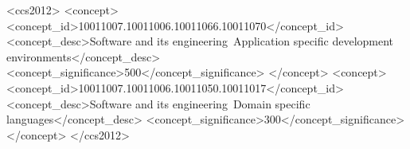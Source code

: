 \documentclass[sigplan,screen]{acmart}
\begin{document}
%
%


\begin{CCSXML}
<ccs2012>
<concept>
<concept_id>10011007.10011006.10011066.10011070</concept_id>
<concept_desc>Software and its engineering~Application specific development environments</concept_desc>
<concept_significance>500</concept_significance>
</concept>
<concept>
<concept_id>10011007.10011006.10011050.10011017</concept_id>
<concept_desc>Software and its engineering~Domain specific languages</concept_desc>
<concept_significance>300</concept_significance>
</concept>
</ccs2012>
\end{CCSXML}


%

\newcommand\parhead[1]{\vspace{1mm}\noindent\textbf{{#1}}\ \ }  
\newcommand\parheadX[1]{\vspace{-0.0mm}\noindent\textbf{{#1}}\ \ }  
\newcommand{\toolurl}[1]{\footnote{\ic{#1}}}
\newcommand{\ic}[1]{\changefont{cmtt}{m}{n}{#1}\normalfont}  %
\newcommand{\changefont}[3]{\fontfamily{#1}\fontseries{#2}\fontshape{#3}\selectfont}
\newcommand{\fig}[1]{Fig. \ref{#1}}  %
\newcommand{\sect}[1]{Section \ref{#1}}  %

\newcommand\TODO[1]{\vspace{1mm}\noindent\textbf{\color{red} {{TODO: {#1}} }}}  
\newcommand\MARKUS[1]{\vspace{1mm}\noindent\textbf{\color{blue} {{MARKUS: {#1}} }}}  
\newcommand\SASCHA[1]{\vspace{1mm}\noindent\textbf{\color{blue} {{SASCHA: {#1}} }}}  
\newcommand\MICHAEL[1]{\vspace{1mm}\noindent\textbf{\color{blue} {{FRAGE MICHAEL: {#1}} }}}
\newcommand\SERGEJ[1]{\vspace{1mm}\noindent\textbf{\color{blue} {{SERGEJ: {#1}} }}}
\newcommand\ANNA[1]{\vspace{1mm}\noindent\textbf{\color{blue} {{ANNA: {#1}} }}}
\newcommand\KLAUS[1]{\vspace{1mm}\noindent\textbf{\color{blue} {{KLAUS: {#1}} }}}
\newcommand\DATEV[1]{\vspace{1mm}\noindent\textbf{\color{teal} {{FRAGE DATEV: {#1}} }}}  
\end{document}
